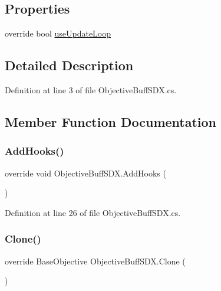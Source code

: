 \subsection*{Properties}
\begin{DoxyCompactItemize}
\item 
override bool \mbox{\hyperlink{class_objective_buff_s_d_x_a6d4d68538f8163ba4efb9017f2aac1bf}{use\+Update\+Loop}}
\end{DoxyCompactItemize}


\subsection{Detailed Description}


Definition at line 3 of file Objective\+Buff\+S\+D\+X.\+cs.



\subsection{Member Function Documentation}
\mbox{\label{class_objective_buff_s_d_x_a480d6da50219905d2c13185bfa612bc5}} 
\subsubsection{\texorpdfstring{AddHooks()}{AddHooks()}}
{\footnotesize\ttfamily override void Objective\+Buff\+S\+D\+X.\+Add\+Hooks (\begin{DoxyParamCaption}{ }\end{DoxyParamCaption})}



Definition at line 26 of file Objective\+Buff\+S\+D\+X.\+cs.

\mbox{\label{class_objective_buff_s_d_x_ad722c8d6d2f1ff2c93392db99b36898d}} 
\subsubsection{\texorpdfstring{Clone()}{Clone()}}
{\footnotesize\ttfamily override Base\+Objective Objective\+Buff\+S\+D\+X.\+Clone (\begin{DoxyParamCaption}{ }\end{DoxyParamCaption})}



